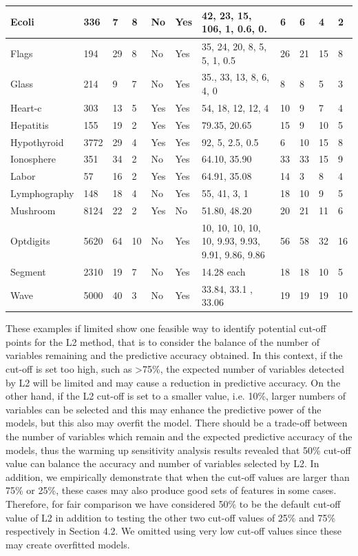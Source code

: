 \documentclass[review]{elsarticle}
\begin{document}
\begin{table}[htbp]
\begin{tabular}{|p{1.5cm}|p{0.5cm}|p{0.5cm}|p{0.5cm}|p{0.5cm}|p{0.5cm}|p{2cm}|p{0.5cm}|p{0.5cm}|p{1cm}|p{1cm}|}
\hline Ecoli & 336 & 7 & 8 & No & Yes & 42,  23, 15, 106, 1,  0.6, 0. & 6 & 6 & 4 & 2 \\ 
\hline Flags & 194 & 29 & 8 & No & Yes & 35, 24, 20, 8, 5, 5,  1, 0.5 & 26 & 21 & 15 & 8 \\ 
\hline Glass & 214 & 9 & 7 & No & Yes & 35., 33, 13, 8, 6, 4, 0 & 8 & 8 & 5 & 3 \\ 
\hline Heart-c & 303 & 13 & 5 & Yes & Yes & 54, 18, 12, 12, 4 & 10 & 9 & 7 & 4 \\ 
\hline Hepatitis & 155 & 19 & 2 & Yes & Yes & 79.35, 20.65 & 15 & 9 & 10 & 5 \\ 
\hline Hypothyroid & 3772 & 29 & 4 & Yes & Yes & 92, 5, 2.5, 0.5 & 6 & 10 & 15 & 8 \\ 
\hline Ionosphere & 351 & 34 & 2 & No & Yes & 64.10, 35.90 & 33 & 33 & 15 & 9 \\ 
\hline Labor & 57 & 16 & 2 & Yes & Yes & 64.91, 35.08 & 14 & 3 & 8 & 4 \\ 
\hline Lymphography & 148 & 18 & 4 & No & Yes & 55, 41, 3, 1 & 18 & 10 & 9 & 5 \\ 
\hline Mushroom & 8124 & 22 & 2 & Yes & No & 51.80, 48.20 & 20 & 21 & 11 & 6 \\ 
\hline Optdigits & 5620 & 64 & 10 & No & Yes & 10, 10, 10, 10, 10,  9.93, 9.93, 9.91, 9.86, 9.86 & 56 & 58 & 32 & 16 \\ 
\hline Segment & 2310 & 19 & 7 & No & Yes & 14.28 each & 18 & 18 & 10 & 5 \\ 
\hline Wave & 5000 & 40 & 3 & No & Yes & 33.84, 33.1 , 33.06 & 19 & 19 & 19 & 10 \\ 
	\hline 
\end{tabular} 
\end{table}





These examples if limited show one feasible way to identify potential cut-off points for the L2 method, that is to consider the balance of the number of variables remaining and the predictive accuracy obtained. In this context, if the cut-off is set too high, such as >75\%, the expected number of variables detected by L2 will be limited and may cause a reduction in predictive accuracy. On the other hand, if the L2 cut-off is set to a smaller value, i.e. 10\%, larger numbers of variables can be selected and this may enhance the predictive power of the models, but this also may overfit the model. There should be a trade-off between the number of variables which remain and the expected predictive accuracy of the models, thus the warming up sensitivity analysis results revealed that 50\% cut-off value can balance the accuracy and number of variables selected by L2.  In addition, we empirically demonstrate that when the cut-off values are larger than 75\% or 25\%, these cases may also produce good sets of features in some cases. Therefore, for fair comparison we have considered 50\% to be the default cut-off value of  L2 in addition to testing the other two cut-off values of 25\% and 75\% respectively in Section 4.2. We omitted using very low cut-off values since these may create overfitted models. 
\end{document}
